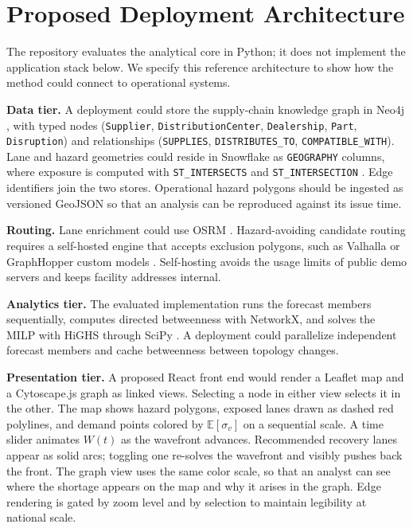 \documentclass[conference]{IEEEtran}
\begin{document}
\section{Proposed Deployment Architecture}\label{sec:system}
The repository evaluates the analytical core in Python; it does not
implement the application stack below. We specify this reference
architecture to show how the method could connect to operational systems.

\textbf{Data tier.} A deployment could store the supply-chain knowledge graph in Neo4j
\cite{neo4j}, with typed nodes (\texttt{Supplier},
\texttt{DistributionCenter}, \texttt{Dealership}, \texttt{Part},
\texttt{Disruption}) and relationships (\texttt{SUPPLIES},
\texttt{DISTRIBUTES\_TO}, \texttt{COMPATIBLE\_WITH}). Lane and hazard
geometries could reside in Snowflake as \texttt{GEOGRAPHY} columns, where
exposure is computed with \texttt{ST\_INTERSECTS} and
\texttt{ST\_INTERSECTION} \cite{snowflakegeo}. Edge identifiers join the
two stores. Operational hazard polygons should be ingested as versioned
GeoJSON so that an analysis can be reproduced against its issue time.

\textbf{Routing.} Lane enrichment could use OSRM \cite{osrm}.
Hazard-avoiding candidate routing requires a self-hosted engine that
accepts exclusion polygons, such as Valhalla \cite{valhalla} or
GraphHopper custom models \cite{graphhopper}. Self-hosting avoids the
usage limits of public demo servers and keeps facility addresses
internal.

\textbf{Analytics tier.} The evaluated implementation runs the forecast
members sequentially, computes directed betweenness with NetworkX, and
solves the MILP with HiGHS through SciPy \cite{highs}. A deployment could
parallelize independent forecast members and cache betweenness between
topology changes.

\textbf{Presentation tier.} A proposed React front end would render a Leaflet map
\cite{leaflet} and a Cytoscape.js graph \cite{franz2016} as linked views.
Selecting a node in either view selects it in the other. The map shows
hazard polygons, exposed lanes drawn as dashed red polylines, and demand
points colored by $\mathbb{E}[\sigma_v]$ on a sequential scale. A time
slider animates $W(t)$ as the wavefront advances. Recommended recovery
lanes appear as solid arcs; toggling one re-solves the wavefront and
visibly pushes back the front. The graph view uses the same color scale,
so that an analyst can see where the shortage appears on the map and why
it arises in the graph. Edge rendering is gated by zoom level and by
selection to maintain legibility at national scale.
\end{document}

